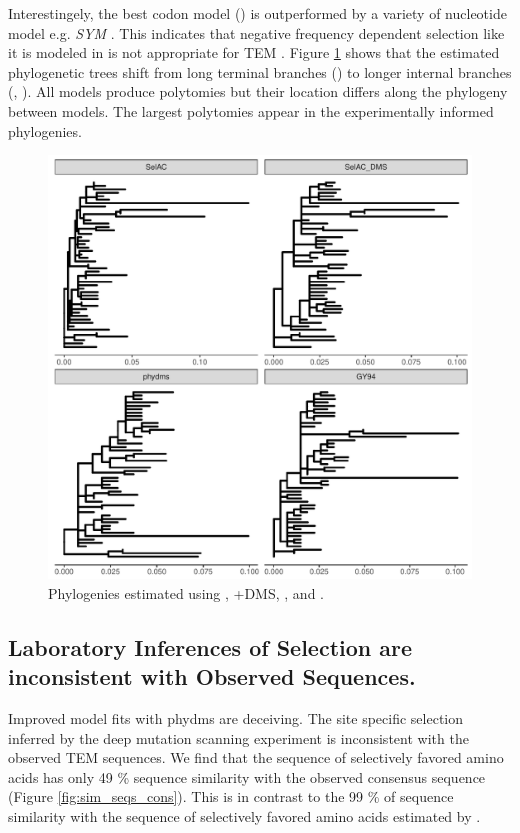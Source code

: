 \documentclass[12pt]{article}
\begin{document}
Interestingely, the best codon model (\gy) \citep{GoldmanAndYang1994} is outperformed by a variety of nucleotide model e.g. \emph{SYM} \citep{zharkikh1994}.
This indicates that negative frequency dependent selection like it is modeled in \gy is not appropriate for TEM \citep{beaulieu2018}.
Figure \ref{fig:phylo} shows that the estimated phylogenetic trees shift from long terminal branches (\selac) to longer internal branches (\phydms, \gy).
All models produce polytomies but their location differs along the phylogeny between models.
The largest polytomies appear in the experimentally informed phylogenies.

\begin{figure}[H]
     \centering
	\includegraphics[width=\textwidth]{img/phy_TEM2016.pdf}
	\caption{Phylogenies estimated using \selac, \selac+DMS, \phydms, and \gy.}
	\label{fig:phylo}
\end{figure}





\subsection*{Laboratory Inferences of Selection are inconsistent with Observed Sequences.}
Improved model fits with phydms are deceiving.
The site specific selection inferred by the deep mutation scanning experiment is inconsistent with the observed TEM sequences.
We find that the sequence of selectively favored amino acids has only 49 \% sequence similarity with the observed consensus sequence (Figure \ref{fig:sim_seqs_cons}).
This is in contrast to the 99 \% of sequence similarity with the sequence of selectively favored amino acids estimated by \selac.
\end{document}
